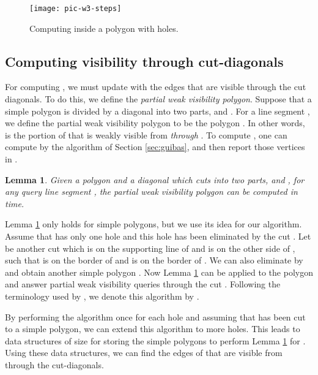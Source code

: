 \documentclass[5p]{elsarticle}
\newtheorem{lemma}[theorem]{Lemma}
\begin{document}
\begin{figure}[h]
  \centering
  \texttt{[image: pic-w3-steps]} 
  \caption{ Computing  inside a polygon with holes.}
  \label{fig:w3-steps}
\end{figure}


\subsection{Computing visibility through cut-diagonals}
\label{sec:alg:cuts}


For computing , we must update  with the edges that 
are visible through the cut diagonals. 
To do this, we define the {\em partial weak visibility polygon}.
Suppose that a simple polygon  is divided by a diagonal  into two parts,  and .
For a line segment , we define the partial weak visibility polygon
 to be the polygon .
In other words,  is the portion of  that is weakly visible from  {\em through} .
To compute , one can compute  by the algorithm of Section \ref{sec:guibas}, 
and then report those vertices in . 



\begin{lemma} 
\label{lemma:partial}
Given a polygon  and a diagonal  which cuts  into two parts,
 and , for any query line segment , the partial weak visibility
polygon  can be computed in  time.
\end{lemma}




Lemma \ref{lemma:partial} only holds for simple polygons, but we use its idea 
for our algorithm. Assume that  has only one hole  and this hole has been eliminated 
by the cut . 
Let  be another cut which is on the supporting line of  and is on the
other side of ,  such that  is on the border of  and  is on the border of .
We can also eliminate  by  and obtain another simple polygon . 
Now Lemma \ref{lemma:partial} can be applied to the polygon  and
answer partial weak visibility queries through the cut . Following the terminology 
used by \cite{zarei}, we denote this algorithm by . 

By performing the  algorithm once for each hole  and assuming that 
has been cut to a simple polygon, we can extend this algorithm to more holes.
This leads to  data structures of size  for storing the simple polygons to
perform Lemma \ref{lemma:partial} for .
Using these data structures, we can find the edges of  that
are visible from  through the cut-diagonals. 
\end{document}
